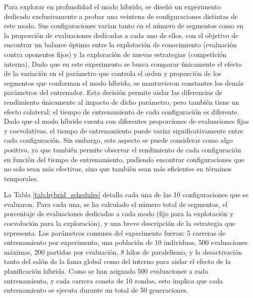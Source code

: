 Para explorar en profundidad el modo híbrido, se diseñó un experimento dedicado exclusivamente a probar una veintena de configuraciones distintas de este modo. Sus configuraciones varían tanto en el número de segmentos como en la proporción de evaluaciones dedicadas a cada uno de ellos, con el objetivo de encontrar un balance óptimo entre la explotación de conocimiento (evaluación contra oponentes fijos) y la exploración de nuevas estrategias (competición interna). Dado que en este experimento se busca comparar únicamente el efecto de la variación en el parámetro que controla el orden y proporción de los segmentos que conforman el modo híbrido, se mantuvieron constantes los demás parámetros del entrenador. Esta decisión permite aislar las diferencias de rendimiento únicamente al impacto de dicho parámetro, pero también tiene un efecto colateral: el tiempo de entrenamiento de cada configuración es diferente. Dado que el modo híbrido cuenta con diferentes proporciones de evaluaciones fijas y coevolutivas, el tiempo de entrenamiento puede variar significativamente entre cada configuración. Sin embargo, este aspecto se puede considerar como algo positivo, ya que también permite observar el rendimiento de cada configuración en función del tiempo de entrenamiento, pudiendo encontrar configuraciones que no solo sean más efectivas, sino que también sean más eficientes en términos temporales.

La Tabla \ref{tab:hybrid_schedules} detalla cada una de las 10 configuraciones que se evaluaron. Para cada una, se ha calculado el número total de segmentos, el porcentaje de evaluaciones dedicadas a cada modo (fijo para la explotación y coevolución para la exploración), y una breve descripción de la estrategia que representa. Los parámetros comunes del experimento fueron: 5 carreras de entrenamiento por experimento, una población de 10 individuos, 500 evaluaciones máximas, 200 partidas por evaluación, 8 hilos de paralelismo, y la desactivación tanto del salón de la fama global como del interno para aislar el efecto de la planificación híbrida. Como se han asignado 500 evaluaciones a cada entrenamiento, y cada carrera consta de 10 rondas, esto implica que cada entrenamiento se ejecuta durante un total de 50 generaciones.

